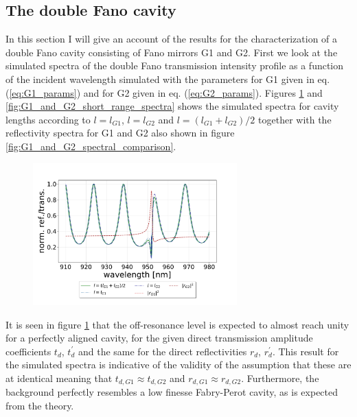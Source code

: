 \clearpage
\subsection{The double Fano cavity}\label{sec:the_double_fano_cavity_results}

In this section I will give an account of the results for the characterization of a double Fano cavity consisting of Fano mirrors G1 and G2. First we look at the simulated spectra of the double Fano transmission intensity profile as a function of the incident wavelength simulated with the parameters for G1 given in eq. (\ref{eq:G1_params}) and for G2 given in eq. (\ref{eq:G2_params}). Figures \ref{fig:G1_and_G2_full_range_spectra} and \ref{fig:G1_and_G2_short_range_spectra} shows the simulated spectra for cavity lengths according to $l=l_{G1}$, $l=l_{G2}$ and $l=(l_{G1}+l_{G2})/2$ together with the reflectivity spectra for G1 and G2 also shown in figure \ref{fig:G1_and_G2_spectral_comparison}. 

\begin{figure}[h!]
    \centering
    \includegraphics[width=0.7\textwidth]{figures/results/M3:M5/M3:M5_sim_spectra_long.pdf}
    \caption{}
    \label{fig:G1_and_G2_full_range_spectra}
\end{figure}

It is seen in figure \ref{fig:G1_and_G2_full_range_spectra} that the off-resonance level is expected to almost reach unity for a perfectly aligned cavity, for the given direct transmission amplitude coefficients $t_d$, $t_d^{\prime}$ and the same for the direct reflectivities $r_d$, $r_d^{\prime}$. This result for the simulated spectra is indicative of the validity of the assumption that these are at identical meaning that $t_{d,G1} \approx t_{d,G2}$ and $r_{d,G1} \approx r_{d,G2}$. Furthermore, the background perfectly resembles a low finesse Fabry-Perot cavity, as is expected from the theory. 

